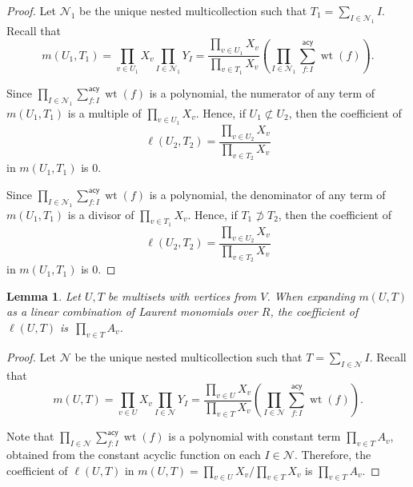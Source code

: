\documentclass[11pt]{article}
\newtheorem{lemm}[theo]{Lemma}
\theoremstyle{definition}
\numberwithin{equation}{section}
\newcommand{\vertices}{V}
\newcommand{\coefficientring}{R}
\newcommand{\laurentmonomial}[2]{\ell(#1, #2)}
\DeclareMathOperator{\weight}{wt}
\newcommand{\sumacy}[1]{\sum_{#1}^{\mathsf{acy}}}
\newcommand{\monomial}[2]{m(#1, #2)}
\begin{document}
\begin{proof}
    Let \(\mathcal{N}_1\) be the unique nested multicollection such that \(T_1 = \sum_{I \in \mathcal{N}_1} I\).
    Recall that
    \begin{equation*}
        \monomial{U_1}{T_1}
        = \prod_{v \in U_1} X_v \prod_{I \in \mathcal{N}_1} Y_I
        = \frac{\prod_{v \in U_1} X_v}{\prod_{v \in T_1} X_v}
        \left(
            \prod_{I \in \mathcal{N}_1} \sumacy{f \colon I} \weight(f)
        \right).
    \end{equation*} 

    Since \( \prod_{I \in \mathcal{N}_1} \sumacy{f \colon I} \weight(f) \) is a polynomial, the numerator of any term of \(\monomial{U_1}{T_1}\) is a multiple of \(\prod_{v \in U_1} X_v\).
    Hence, if \(U_1 \not\subset U_2\),
    then the coefficient of
    \begin{equation*}
		\laurentmonomial{U_2}{T_2} = \frac{\prod_{v \in U_2} X_v}{\prod_{v \in T_2} X_v}
	\end{equation*}
    in \(\monomial{U_1}{T_1}\) is \(0\).

    Since \( \prod_{I \in \mathcal{N}_1} \sumacy{f \colon I} \weight(f) \) is a polynomial,
    the denominator of any term of \(\monomial{U_1}{T_1}\) is a divisor of \(\prod_{v \in T_1} X_v\).
    Hence, if \(T_1 \not\supset T_2\),
    then the coefficient of
    \begin{equation*}
		\laurentmonomial{U_2}{T_2} = \frac{\prod_{v \in U_2} X_v}{\prod_{v \in T_2} X_v}
	\end{equation*}
    in \(\monomial{U_1}{T_1}\) is \(0\).
\end{proof}

\begin{lemm} \label{lemma:coefficient:UT}
    Let \(U, T\) be multisets with vertices from \(\vertices\).
    When expanding \(\monomial{U}{T}\) as a linear combination of Laurent monomials over \(\coefficientring\), the coefficient of \(\laurentmonomial{U}{T}\) is~\(\prod_{v \in T} A_v\).
\end{lemm}

\begin{proof}
    Let \(\mathcal{N}\) be the unique nested multicollection such that \(T = \sum_{I \in \mathcal{N}} I\).
    Recall that
    \begin{equation*}
        \monomial{U}{T}
        = \prod_{v \in U} X_v \prod_{I \in \mathcal{N}} Y_I 
        = \frac{\prod_{v \in U} X_v}{\prod_{v \in T} X_v}
        \left(
            \prod_{I \in \mathcal{N}} \sumacy{f \colon I} \weight(f)
        \right).
    \end{equation*}

    Note that \( \prod_{I \in \mathcal{N}} \sumacy{f \colon I} \weight(f) \) is a polynomial with constant term \(\prod_{v \in T} A_v\), obtained from the constant acyclic function on each \(I \in \mathcal{N}\).
    Therefore, the coefficient of \(\laurentmonomial{U}{T}\) in \(\monomial{U}{T} = {\prod_{v \in U} X_v} \big/ {\prod_{v \in T}X_v}\) is \(\prod_{v \in T} A_v\).
\end{proof}
\end{document}
